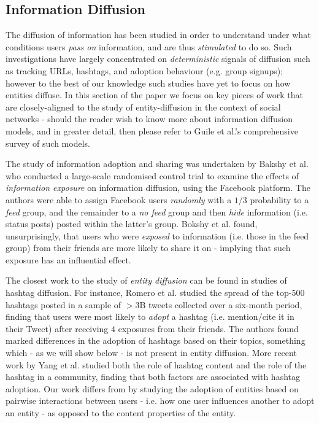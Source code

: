 \documentclass[journal,10pt,draftclsnofoot,onecolumn]{IEEEtran}
\begin{document}
\subsection{Information Diffusion}
The diffusion of information has been studied in order to understand under what conditions users \emph{pass on} information, and are thus \emph{stimulated} to do so.
Such investigations have largely concentrated on \emph{deterministic} signals of diffusion such as tracking URLs, hashtags, and adoption behaviour (e.g. group signups); however to the best of our knowledge such studies have yet to focus on how entities diffuse.
In this section of the paper we focus on key pieces of work that are closely-aligned to the study of entity-diffusion in the context of social networks - should the reader wish to know more about information diffusion models, and in greater detail, then please refer to Guile et al.'s \cite{guille2013information} comprehensive survey of such models.

The study of information adoption and sharing was undertaken by Bakshy et al. \cite{bakshy2012role} who conducted a large-scale randomised control trial to examine the effects of \emph{information exposure} on information diffusion, using the Facebook platform.
The authors were able to assign Facebook users \emph{randomly} with a $1/3$ probability to a \emph{feed} group, and the remainder to a \emph{no feed} group and then \emph{hide} information (i.e. status posts) posted within the latter's group.
Bokshy et al. found, unsurprisingly, that users who were \emph{exposed} to information (i.e. those in the feed group) from their friends are more likely to share it on - implying that such exposure has an influential effect.

The closest work to the study of \emph{entity diffusion} can be found in studies of hashtag diffusion.
For instance, Romero et al. \cite{romero2011differences} studied the spread of the top-500 hashtags posted in a sample of $>3$B tweets collected over a six-month period, finding that users were most likely to \emph{adopt} a hashtag (i.e. mention/cite it in their Tweet) after receiving $4$ exposures from their friends.
The authors found marked differences in the adoption of hashtags based on their topics, something which - as we will show below - is not present in entity diffusion.
More recent work by Yang et al. \cite{yang2012we} studied both the role of hashtag content and the role of the hashtag in a community, finding that both factors are associated with hashtag adoption.
Our work differs from \cite{yang2012we} by studying the adoption of entities based on pairwise interactions between users - i.e. how one user influences another to adopt an entity - as opposed to the content properties of the entity.
\end{document}
